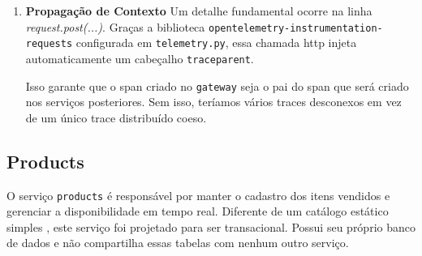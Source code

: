 \begin{enumerate}
\begin{lstlisting}[language=Python, caption={Roteamento do Gateway para um servico}, label={lst:pyex}]
    @gateway_bp.route('/checkout/', methods=['POST'])
    def checkout_gateway():
    span = trace.get_current_span()
    
    ''' 1. Verificacao de Seguranca Centralizada'''
    user_id = session.get('user_id')
    if not user_id:
        return jsonify({"error": "Usuario nao autenticado"}), 401
    span.set_attribute("user.id", user_id)

    try:
        ''' 2. Busca o carrinho do usuario (Chamada Sincrona ao Cart Service)'''
        ''' Note o repasse de cookies para manter o contexto se necessario'''
        cart_response = requests.get(CART_API_URL, params={'user_id': user_id}, cookies=request.cookies)
        
        cart_items = cart_response.json()
        
        ''' 3. Monta o payload e chama o servico de Checkout'''
        payload = {
            "user_id": user_id,
            "cart_items": cart_items
        }
        checkout_response = requests.post(CHECKOUT_API_URL, json=payload, cookies=request.cookies)
        
        return checkout_response.content, checkout_response.status_code, checkout_response.headers.items()

    except requests.exceptions.RequestException as e:
        ''' Isolamento de erro: o Gateway captura falhas de rede dos servicos internos'''
        return jsonify({"error": "Erro de comunicacao com os servicos", "details": str(e)}), 503
    \end{lstlisting}
    \item \textbf{Propagação de Contexto} Um detalhe fundamental ocorre na linha \textit{request.post(...)}. Graças a biblioteca \texttt{opentelemetry-instrumentation-requests} configurada em \texttt{telemetry.py}, essa chamada http injeta automaticamente um cabeçalho \texttt{traceparent}.

    Isso garante que o span criado no \texttt{gateway} seja o pai do span que será criado nos serviços posteriores. Sem isso, teríamos vários traces desconexos em vez de um único trace distribuído coeso.
\end{enumerate}

\subsection{Products}
O serviço \texttt{products} é responsável por manter o cadastro dos itens vendidos e gerenciar a disponibilidade em tempo real. Diferente de um catálogo estático simples , este serviço foi projetado para ser transacional. Possui seu próprio banco de dados e não compartilha essas tabelas com nenhum outro serviço.

